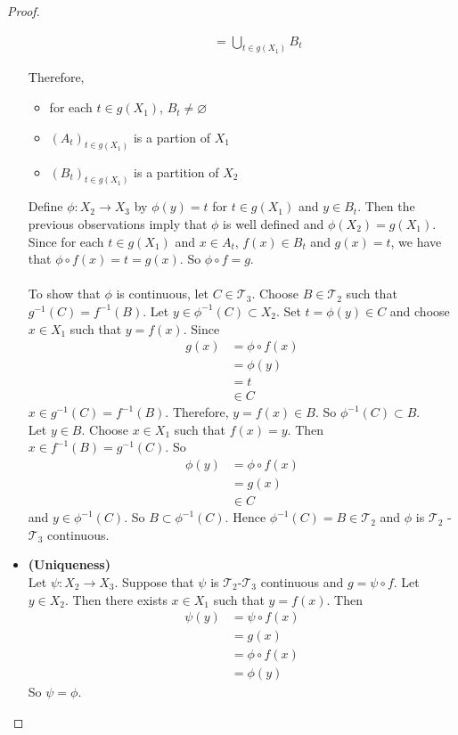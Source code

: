\documentclass[12pt]{amsart}
\theoremstyle{definition}
\newcommand{\MT}{\mathcal{T}}
\newcommand{\tbf}[1]{\textbf{#1}}
\DeclareMathOperator*{\0}{\mbf{0}}
\DeclareMathOperator*{\1}{\mbf{1}}
\begin{document}
\begin{proof}
\begin{itemize}
\begin{itemize}
\begin{align*}
	&= \bigcup_{t \in g(X_1)} B_t
	\end{align*}
	\end{itemize}
	Therefore, 
	\begin{itemize}
	\item for each $t \in g(X_1)$, $B_t \neq \varnothing$
	\item $(A_t)_{t \in g(X_1)}$ is a partion of $X_1$
	\item $(B_t)_{t \in g(X_1)}$ is a partition of $X_2$\\
\end{itemize}		
	 Define $\phi:X_2 \rightarrow X_3$ by $\phi(y) = t$ for $t \in g(X_1)$ and $y \in B_t $. Then the previous observations imply that $\phi$ is well defined and $\phi(X_2) = g(X_1)$. Since for each $t \in g(X_1)$ and $x \in A_t$, $f(x) \in B_t$ and $g(x) = t$, we have that $\phi \circ f (x) = t = g(x)$. So $\phi \circ f = g$. \\ \\
	To show that $\phi$ is continuous, let $C \in \MT_3$. Choose $B \in \MT_2$ such that $g^{-1}(C) = f^{-1}(B)$.
	Let $y \in \phi^{-1}(C) \subset X_2$. Set $t = \phi(y) \in C$ and choose $x \in X_1$ such that $y = f(x)$. Since 
	\begin{align*}
	g(x) 
	&= \phi \circ f (x) \\
	&= \phi(y) \\
	&= t \\
	&\in C
\end{align*}		
	 $x \in g^{-1}(C) = f^{-1}(B)$. Therefore, $y = f(x) \in B$. So $\phi^{-1}(C) \subset B$. \\
	Let $y \in B$. Choose $x \in X_1$ such that $f(x) = y$. Then $x \in f^{-1}(B) = g^{-1}(C)$. So 
	\begin{align*}
	\phi(y) 
	&= \phi \circ f (x) \\
	&= g(x) \\
	&\in C
	\end{align*}	 
	and $y \in \phi^{-1}(C)$. So $B \subset \phi^{-1}(C)$. 
	Hence $\phi^{-1}(C) = B \in \MT_2$ and $\phi$ is $\MT_2$ - $\MT_3$ continuous.\\
	\item \tbf{(Uniqueness)} \\
	Let $\psi: X_2 \rightarrow X_3$. Suppose that $\psi$ is $\MT_2$-$\MT_3$ continuous and $g = \psi \circ f$. Let $y \in X_2$. Then there exists $x \in X_1$ such that $y = f(x)$. Then 
	\begin{align*}
	\psi(y) 
	&= \psi \circ f(x) \\
	&= g(x) \\
	&= \phi \circ f(x) \\
	&= \phi(y)
	\end{align*}
	So $\psi = \phi$.
	\end{itemize}
 
	\end{proof}
\end{document}
